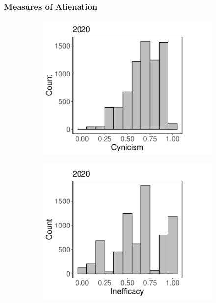 \documentclass[12pt]{article}
\begin{document}
\begin{appendices}
\begin{refsection}
\subsubsection{Measures of Alienation}\label{si:desc:alienation} %
    \begin{figure}
        \centering
        \begin{subfigure}[b]{0.4\textwidth}
            \centering
            \includegraphics[width=\textwidth]{Figures/Descriptives-Histogram-Cynicism-2020.pdf}
        \end{subfigure}
        \begin{subfigure}[b]{0.4\textwidth}  
            \centering 
            \includegraphics[width=\textwidth]{Figures/Descriptives-Histogram-Inefficacy-2020.pdf}
        \end{subfigure}
        

\end{figure}
\end{refsection}
\end{appendices}
\end{document}
